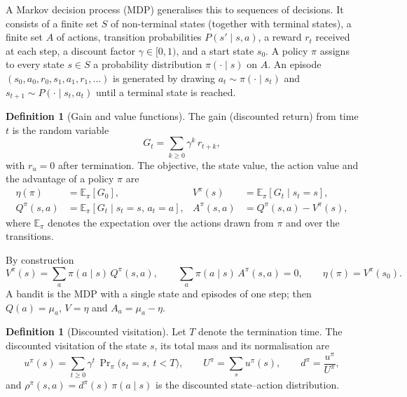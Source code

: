 \documentclass[11pt,a4paper]{article}
\numberwithin{equation}{section}
\theoremstyle{plain}
\theoremstyle{definition}
\newtheorem{definition}[theorem]{Definition}
\theoremstyle{remark}
\newcommand{\E}{\mathbb{E}}
\begin{document}
A Markov decision process (MDP) generalises this to sequences of decisions. It consists of a finite
set $S$ of non-terminal states (together with terminal states), a finite set $A$ of actions,
transition probabilities $P(s'\mid s,a)$, a reward $r_t$ received at each step, a discount factor
$\gamma\in[0,1)$, and a start state $s_0$. A policy $\pi$ assigns to every state $s\in S$ a
probability distribution $\pi(\cdot\mid s)$ on $A$. An episode $(s_0,a_0,r_0,s_1,a_1,r_1,\dots)$ is
generated by drawing $a_t\sim\pi(\cdot\mid s_t)$ and $s_{t+1}\sim P(\cdot\mid s_t,a_t)$ until a terminal
state is reached.

\begin{definition}[Gain and value functions]\label{def:gain}
The gain (discounted return) from time $t$ is the random variable
\begin{equation}\label{eq:gain}
  G_t=\sum_{k\ge 0}\gamma^{k}\,r_{t+k},
\end{equation}
with $r_u=0$ after termination. The objective, the state value, the action value and the advantage
of a policy $\pi$ are
\begin{align}
  \eta(\pi)&=\E_\pi[G_0], &
  V^\pi(s)&=\E_\pi[G_t\mid s_t=s],\nonumber\\
  Q^\pi(s,a)&=\E_\pi[G_t\mid s_t=s,\,a_t=a], &
  A^\pi(s,a)&=Q^\pi(s,a)-V^\pi(s), \label{eq:values}
\end{align}
where $\E_\pi$ denotes the expectation over the actions drawn from $\pi$ and over the transitions.
\end{definition}

By construction
\[
  V^\pi(s)=\sum_{a}\pi(a\mid s)\,Q^\pi(s,a),
  \qquad
  \sum_{a}\pi(a\mid s)\,A^\pi(s,a)=0,
  \qquad
  \eta(\pi)=V^\pi(s_0).
\]
A bandit is the MDP with a single state and episodes of one step; then $Q(a)=\mu_a$, $V=\eta$ and
$A_a=\mu_a-\eta$.

\begin{definition}[Discounted visitation]\label{def:visitation}
Let $T$ denote the termination time. The discounted visitation of the state $s$, its total mass and
its normalisation are
\begin{equation}\label{eq:visitation}
  u^\pi(s)=\sum_{t\ge 0}\gamma^{t}\,\Pr\nolimits_\pi\!\bigl(s_t=s,\ t<T\bigr),
  \qquad
  U^\pi=\sum_{s}u^\pi(s),
  \qquad
  d^\pi=\frac{u^\pi}{U^\pi},
\end{equation}
and $\rho^\pi(s,a)=d^\pi(s)\,\pi(a\mid s)$ is the discounted state--action distribution.
\end{definition}
\end{document}
